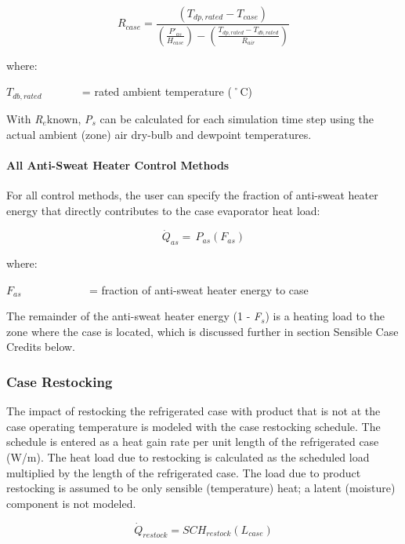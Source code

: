 \begin{equation}
{R_{case}} = \frac{{\left( {{T_{dp,rated}} - {T_{case}}} \right)}}{{\left( {\frac{{{P'}_{as}}}{{{H_{case}}}}} \right) - \left( {\frac{{{T_{dp,rated}} - {T_{db,rated}}}}{{{R_{air}}}}} \right)}}
\end{equation}

where:

\({T_{db,rated}}\) ~~~~~~ = rated ambient temperature (˚C)

With \emph{R\(_{e}\)}known, \emph{P\(_{s}\)} can be calculated for each simulation time step using the actual ambient (zone) air dry-bulb and dewpoint temperatures.

\paragraph{All Anti-Sweat Heater Control Methods}\label{all-anti-sweat-heater-control-methods}

For all control methods, the user can specify the fraction of anti-sweat heater energy that directly contributes to the case evaporator heat load:

\begin{equation}
{\dot Q_{as}} = \,{P_{as}}\left( {{F_{as}}} \right)
\end{equation}

where:

\({F_{as}}\) ~~~~~~~~~~~ = fraction of anti-sweat heater energy to case

The remainder of the anti-sweat heater energy (1 - \emph{F\(_{s}\)}) is a heating load to the zone where the case is located, which is discussed further in section Sensible Case Credits below.

\subsubsection{Case Restocking}\label{case-restocking}

The impact of restocking the refrigerated case with product that is not at the case operating temperature is modeled with the case restocking schedule. The schedule is entered as a heat gain rate per unit length of the refrigerated case (W/m). The heat load due to restocking is calculated as the scheduled load multiplied by the length of the refrigerated case. The load due to product restocking is assumed to be only sensible (temperature) heat; a latent (moisture) component is not modeled.

\begin{equation}
{\dot Q_{restock}} = SC{H_{restock}}\left( {{L_{case}}} \right)
\end{equation}

